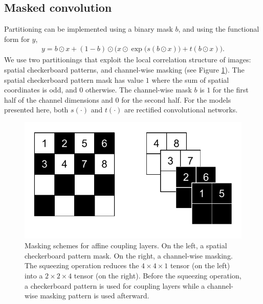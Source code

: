 \documentclass{article}
\newcommand{\jcom}[1]{\textcolor{darkgreen}{[jascha: #1]}}
\begin{document}
\subsection{Masked convolution}
Partitioning can be implemented using a binary mask $b$, and using the functional form for $y$,
\begin{align}
y = b \odot x + (1 - b) \odot \Big(x \odot \exp\big(s(b \odot x)\big) + t(b \odot x)\Big)
.
\end{align}
We use two partitionings that exploit the local correlation structure of images: spatial checkerboard patterns, and channel-wise masking (see Figure \ref{fig:squeezing}). The spatial checkerboard pattern mask has value $1$ where the sum of spatial coordinates is odd, and $0$ otherwise. The channel-wise mask $b$ is $1$ for the first half of the channel dimensions and $0$ for the second half.
For the models presented here, both $s(\cdot)$ and $t(\cdot)$ are rectified convolutional networks.
\begin{figure}
    \centering \includegraphics[width=.6\textwidth]{masks.pdf}
\vspace{-10pt}
    \caption{Masking schemes for affine coupling layers. On the left, a spatial checkerboard pattern mask. On the right, a channel-wise masking. The squeezing operation reduces the $4 \times 4 \times 1$ tensor (on the left) into a $2 \times 2 \times 4$ tensor (on the right). Before the squeezing operation, a checkerboard pattern is used for coupling layers while a channel-wise masking pattern is used afterward. %
    }
    \label{fig:squeezing}
\end{figure}
\end{document}
